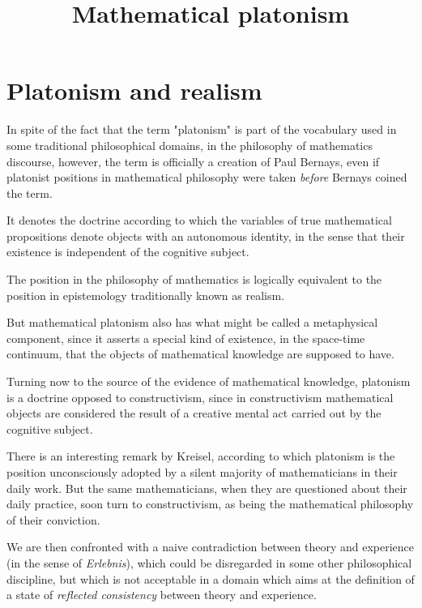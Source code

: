\documentclass[12pt]{article}
\begin{document}
\title{Mathematical platonism}\Large 
\maketitle

\tableofcontents

\section{Platonism and realism}\normalsize

In spite of the fact that the term "platonism" is part of the vocabulary used in some traditional philosophical domains, in the philosophy of mathematics discourse, however, the term is officially a creation of Paul Bernays, even if platonist positions in mathematical philosophy were taken \emph{before} Bernays coined the term.

It denotes the doctrine according to which the variables of true mathematical propositions denote objects with an autonomous identity, in the sense that their existence is independent of the cognitive subject.

The position in the philosophy of mathematics is logically equivalent to the position in epistemology traditionally  known as realism.

But mathematical platonism also has what might be called a metaphysical component, since it asserts a special kind of existence, in the space-time continuum, that the objects of mathematical knowledge are supposed to have.

Turning now to the source of the evidence of mathematical knowledge, platonism is a doctrine opposed to constructivism, since in constructivism mathematical objects are considered the result of a creative mental act carried out by the cognitive subject.

There is an interesting remark by Kreisel, according to which platonism is the position unconsciously adopted by a silent majority of mathematicians in their daily work. But the same mathematicians, when they are questioned about their daily practice, soon turn to constructivism, as being the  mathematical philosophy of their conviction.

We are then confronted with a naive contradiction between theory and experience (in the sense of \emph{Erlebnis}), which could be disregarded in some other philosophical discipline, but which is not acceptable in a domain which aims at the definition of a state of \emph{reflected consistency} between theory and experience.
\end{document}

